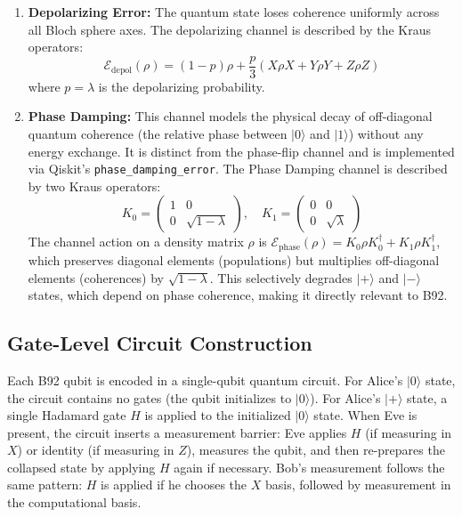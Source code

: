 \documentclass[conference]{IEEEtran}
\begin{document}
\begin{enumerate}
    \item \textbf{Depolarizing Error:} The quantum state loses coherence uniformly across all Bloch sphere axes. The depolarizing channel is described by the Kraus operators:
    \begin{equation}
    \mathcal{E}_{\text{depol}}(\rho) = (1-p)\rho + \frac{p}{3}(X\rho X + Y\rho Y + Z\rho Z)
    \end{equation}
    where $p = \lambda$ is the depolarizing probability.
    \item \textbf{Phase Damping:} This channel models the physical decay of off-diagonal quantum coherence (the relative phase between $|0\rangle$ and $|1\rangle$) without any energy exchange. It is distinct from the phase-flip channel and is implemented via Qiskit's \texttt{phase\_damping\_error}. The Phase Damping channel is described by two Kraus operators:
    \begin{equation}
    K_0 = \begin{pmatrix} 1 & 0 \\ 0 & \sqrt{1-\lambda} \end{pmatrix}, \quad K_1 = \begin{pmatrix} 0 & 0 \\ 0 & \sqrt{\lambda} \end{pmatrix}
    \end{equation}
    The channel action on a density matrix $\rho$ is $\mathcal{E}_{\text{phase}}(\rho) = K_0 \rho K_0^\dagger + K_1 \rho K_1^\dagger$, which preserves diagonal elements (populations) but multiplies off-diagonal elements (coherences) by $\sqrt{1-\lambda}$. This selectively degrades $|+\rangle$ and $|-\rangle$ states, which depend on phase coherence, making it directly relevant to B92.
\end{enumerate}


\subsection{Gate-Level Circuit Construction}
Each B92 qubit is encoded in a single-qubit quantum circuit. For Alice's $|0\rangle$ state, the circuit contains no gates (the qubit initializes to $|0\rangle$). For Alice's $|+\rangle$ state, a single Hadamard gate $H$ is applied to the initialized $|0\rangle$ state. When Eve is present, the circuit inserts a measurement barrier: Eve applies $H$ (if measuring in $X$) or identity (if measuring in $Z$), measures the qubit, and then re-prepares the collapsed state by applying $H$ again if necessary. Bob's measurement follows the same pattern: $H$ is applied if he chooses the $X$ basis, followed by measurement in the computational basis.
\end{document}
